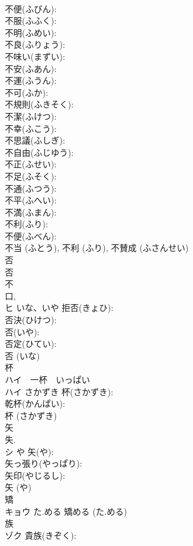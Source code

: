 \documentclass[8pt]{extreport}
\begin{document}
\begin{CJK}{UTF8}{min}
\\	不便(ふびん): 
\\	不服(ふふく): 
\\	不明(ふめい): 
\\	不良(ふりょう): 
\\	不味い(まずい): 
\\	不安(ふあん): 
\\	不運(ふうん): 
\\	不可(ふか): 
\\	不規則(ふきそく): 
\\	不潔(ふけつ): 
\\	不幸(ふこう): 
\\	不思議(ふしぎ): 
\\	不自由(ふじゆう): 
\\	不正(ふせい): 
\\	不足(ふそく): 
\\	不通(ふつう): 
\\	不平(ふへい): 
\\	不満(ふまん): 
\\	不利(ふり): 
\\	不便(ふべん): 
\\	不当 (ふとう), 不利 (ふり), 不賛成 (ふさんせい)
\\	否			
\\	否 
\\	不 
\\	口, 
\\	ヒ	いな、いや	拒否(きょひ): 
\\	否決(ひけつ): 
\\	否(いや): 
\\	否定(ひてい): 
\\	否 (いな)
\\	杯			
\\	ハイ　一杯　いっぱい
\\	ハイ	さかずき	杯(さかずき): 
\\	乾杯(かんぱい): 
\\	杯 (さかずき)
\\	矢			
\\	失.	
\\	シ	や	矢(や): 
\\	矢っ張り(やっぱり): 
\\	矢印(やじるし): 
\\	矢 (や)
\\	矯			
\\	キョウ	た.める		矯める (た.める)
\\	族			
\\	ゾク		貴族(きぞく): 

\end{CJK}
\end{document}

